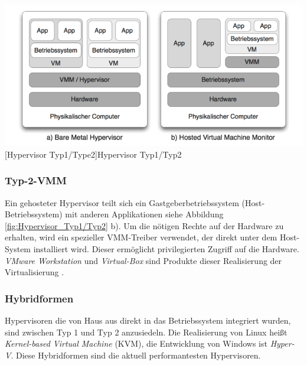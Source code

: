 \vspace{1em}
\begin{minipage}{\linewidth}
	\centering
	\includegraphics[width=1\linewidth]{pics/Hypervisoren.PNG}
	[Hypervisor Typ1/Type2]{Hypervisor Typ1/Typ2 \cite{Meinel2011VirtualisierungMarktubersicht} }
	\label{fig:Hypervisor_Typ1/Typ2}
\end{minipage}

\subsubsection{Typ-2-VMM}
Ein gehosteter Hypervisor teilt sich ein Gastgeberbetriebssystem (Host-Betriebssystem) mit anderen Applikationen siehe Abbildung \ref{fig:Hypervisor_Typ1/Typ2} b). Um die nötigen Rechte auf der Hardware zu erhalten, wird ein spezieller VMM-Treiber verwendet, der direkt unter dem Host-System installiert wird. Dieser ermöglicht privilegierten Zugriff auf die Hardware. \emph{VMware Workstation} und \emph{Virtual-Box} sind Produkte dieser Realisierung der Virtualisierung \cite{Glatz2015Betriebssysteme}.

\subsubsection{Hybridformen}
Hypervisoren die von Haus aus direkt in das Betriebssystem integriert wurden, sind zwischen Typ 1 und Typ 2 anzusiedeln. Die Realisierung von Linux heißt \emph{Kernel-based Virtual Machine} (KVM), die Entwicklung von Windows ist \emph{Hyper-V}. Diese Hybridformen sind die aktuell performantesten Hypervisoren. 

